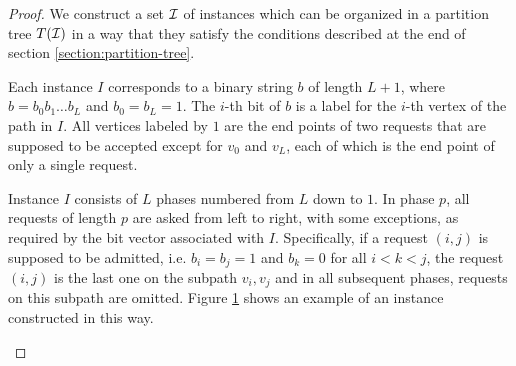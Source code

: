\begin{proof}
    We construct a set $\mathcal{I}$ of instances which can be organized in a
    partition tree $T(\mathcal{I})$ in a way that they satisfy the conditions
    described at the end of section \ref{section:partition-tree}.

    Each instance $I$ corresponds to a binary string $b$ of length $L+1$,
    where $b = b_0b_1\dots{}b_L$ and $b_0 = b_L = 1$. The $i$-th bit of
    $b$ is a label for the $i$-th vertex of the path in $I$. All vertices
    labeled by $1$ are the end points of two requests that are supposed to
    be accepted except for $v_0$ and $v_L$, each of which is the end
    point of only a single request.

    Instance $I$ consists of $L$ phases numbered from $L$ down to $1$. In
    phase $p$, all requests of length $p$ are asked from left to right,
    with some exceptions, as required by the bit vector associated with
    $I$. Specifically, if a request $(i, j)$ is supposed to be admitted,
    i.e. $b_i = b_j = 1$ and $b_k = 0$ for all $i < k < j$, the request
    $(i, j)$ is the last one on the subpath $v_i, v_j$ and in all
    subsequent phases, requests on this subpath are omitted. Figure
    \ref{fig:dpa-lower-optimum} shows an example of an instance
    constructed in this way.

    \begin{figure}\centering
        \label{fig:dpa-lower-optimum}
\end{figure}
\end{proof}
